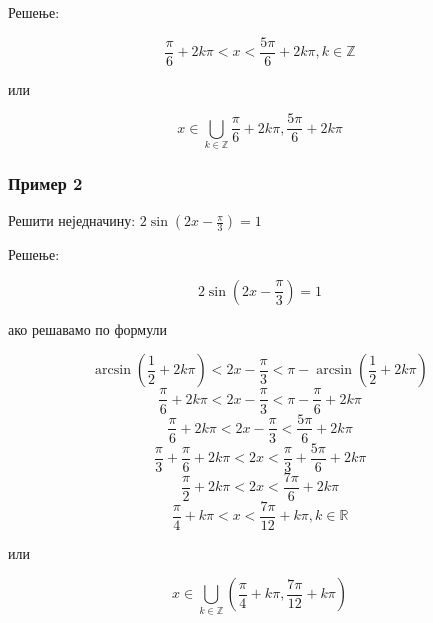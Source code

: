 \documentclass[../diplomski.tex]{subfiles}
\begin{document}


Решење:

\[\frac{\pi}{6}+2k\pi<x<\frac{5\pi}{6}+2k\pi,k\in\mathbb{Z}\]
\centerline{или}
\[x\in\bigcup_{k\in\mathbb{Z}}\frac{\pi}{6}+2k\pi,\frac{5\pi}{6}+2k\pi\]


\subsubsection{Пример 2}

Решити неједначину: $2\sin(2x-\frac{\pi}{3})=1$

Решење:

\[2\sin(2x-\frac{\pi}{3})=1\]

ако решавамо по формули

\[\arcsin\left(\frac{1}{2}+2k\pi\right)<2x-\frac{\pi}{3}<\pi-\arcsin\left(\frac{1}{2}+2k\pi\right)\]
\[\frac{\pi}{6}+2k\pi<2x-\frac{\pi}{3}<\pi-\frac{\pi}{6}+2k\pi\]
\[\frac{\pi}{6}+2k\pi<2x-\frac{\pi}{3}<\frac{5\pi}{6}+2k\pi\]
\[\frac{\pi}{3}+\frac{\pi}{6}+2k\pi<2x<\frac{\pi}{3}+\frac{5\pi}{6}+2k\pi\]
\[\frac{\pi}{2}+2k\pi<2x<\frac{7\pi}{6}+2k\pi\]
\[\frac{\pi}{4}+k\pi<x<\frac{7\pi}{12}+k\pi,k\in\mathbb{R}\]
\centerline{или}
\[x\in\bigcup_{k\in\mathbb{Z}}(\frac{\pi}{4}+k\pi,\frac{7\pi}{12}+k\pi)\]
\end{document}
